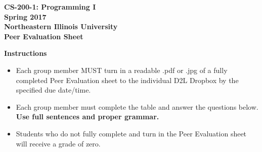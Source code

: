 \documentclass[12pt]{article}
\begin{document}
\begin{center}
	\textbf{CS-200-1: Programming I}\\
	\textbf{Spring 2017}\\
	\textbf{Northeastern Illinois University}\\
	\textbf{Peer Evaluation Sheet}
\end{center}

\noindent\textbf{Instructions}
\begin{itemize}
	\item Each group member MUST turn in a readable .pdf or .jpg of a fully completed Peer Evaluation sheet to the individual D2L Dropbox by the specified due date/time.
	\item Each group member must complete the table and answer the questions below. \textbf{Use full sentences and proper grammar.}
	\item Students who do not fully complete and turn in the Peer Evaluation sheet will receive a grade of zero.
\end{itemize}
\end{document}
